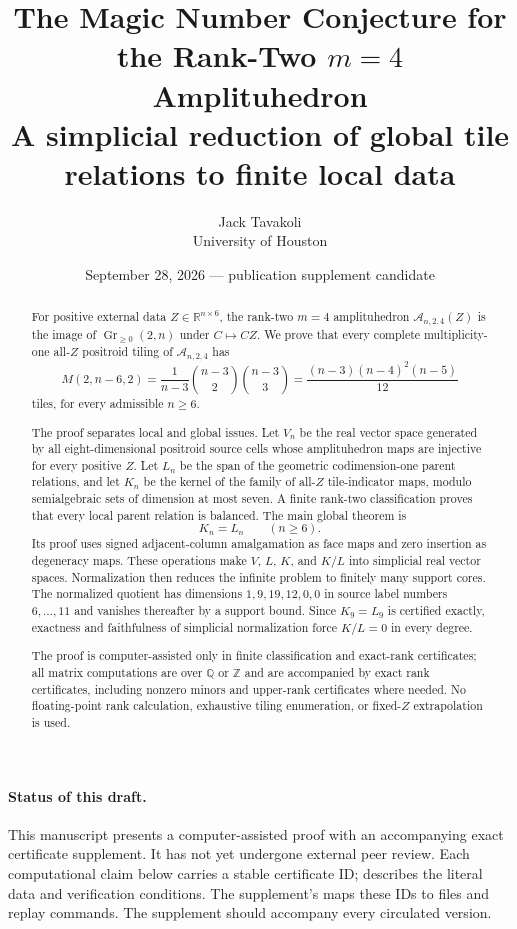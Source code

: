 \documentclass[11pt]{article}
\title{The Magic Number Conjecture for the Rank-Two $m=4$ Amplituhedron\\
\large A simplicial reduction of global tile relations to finite local data}
\author{Jack Tavakoli\\University of Houston}
\date{September 28, 2026 --- publication supplement candidate}
\newcommand{\Gr}{\operatorname{Gr}}
\newcommand{\A}{\mathcal A}
\newcommand{\R}{\mathbb R}
\newcommand{\1}{\mathbf 1}
\begin{document}
\maketitle

\begin{abstract}
For positive external data $Z\in\R^{n\times 6}$, the rank-two $m=4$
amplituhedron $\A_{n,2,4}(Z)$ is the image of $\Gr_{\ge 0}(2,n)$ under
$C\mapsto CZ$.  We prove that every complete multiplicity-one all-$Z$
positroid tiling of $\A_{n,2,4}$ has
\[
M(2,n-6,2)
=\frac{1}{n-3}\binom{n-3}{2}\binom{n-3}{3}
=\frac{(n-3)(n-4)^2(n-5)}{12}
\]
tiles, for every admissible $n\ge 6$.

The proof separates local and global issues.  Let $V_n$ be the real vector
space generated by all eight-dimensional positroid source cells whose
amplituhedron maps are injective for every positive $Z$.  Let $L_n$ be the
span of the geometric codimension-one parent relations, and let $K_n$ be
the kernel of the family of all-$Z$ tile-indicator maps, modulo
semialgebraic sets of dimension at most seven.  A finite rank-two
classification proves that every local parent relation is balanced.  The
main global theorem is
\[
K_n=L_n\qquad(n\ge 6).
\]
Its proof uses signed adjacent-column amalgamation as face maps and zero
insertion as degeneracy maps.  These operations make $V$, $L$, $K$, and
$K/L$ into simplicial real vector spaces.  Normalization then reduces the
infinite problem to finitely many support cores.  The normalized quotient
has dimensions $1,9,19,12,0,0$ in source label numbers $6,\dots,11$ and
vanishes thereafter by a support bound.  Since $K_9=L_9$ is certified
exactly, exactness and faithfulness of simplicial normalization force
$K/L=0$ in every degree.

The proof is computer-assisted only in finite classification and exact-rank
certificates; all matrix computations are over $\mathbb Q$ or $\mathbb Z$
and are accompanied by exact rank certificates, including nonzero minors
and upper-rank certificates where needed.  No
floating-point rank calculation, exhaustive tiling enumeration, or
fixed-$Z$ extrapolation is used.
\end{abstract}

\paragraph{Status of this draft.}
This manuscript presents a computer-assisted proof with an accompanying
exact certificate supplement.  It has not yet undergone external peer
review.  Each computational claim below carries a stable certificate ID;
 describes the literal data and verification
conditions.  The supplement's  maps these IDs
to files and replay commands.  The supplement should accompany every
circulated version.
\end{document}
